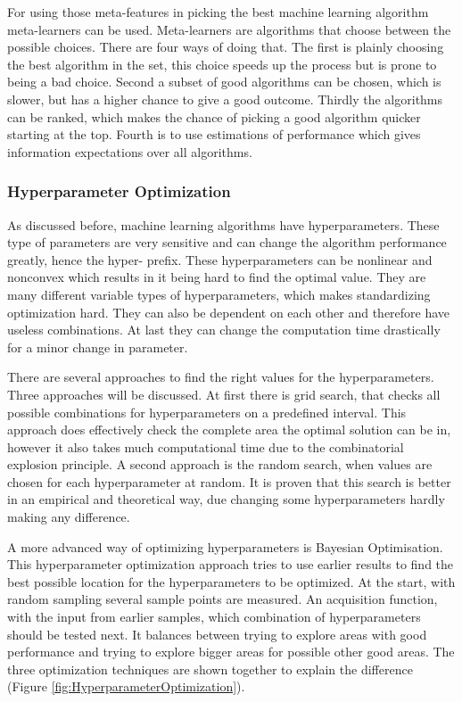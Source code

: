 \documentclass[10pt,a4paper]{article}
\begin{document}
	For using those meta-features in picking the best machine learning algorithm meta-learners can be used. Meta-learners are algorithms that choose between the possible choices. There are four ways of doing that. The first is plainly choosing the best algorithm in the set, this choice speeds up the process but is prone to being a bad choice. Second a subset of good algorithms can be chosen, which is slower, but has a higher chance to give a good outcome. Thirdly the algorithms can be ranked, which makes the chance of picking a good algorithm quicker starting at the top. Fourth is to use estimations of performance which gives information expectations over all algorithms.\cite{brazdil2009development}

	\subsubsection{Hyperparameter Optimization}
	\label{subsubsec:Hyperparameter optimization}

	As discussed before, machine learning algorithms have hyperparameters. These type of parameters are very sensitive and can change the algorithm performance greatly, hence the hyper- prefix. These hyperparameters can be nonlinear and nonconvex which results in it being hard to find the optimal value. They are many different variable types of hyperparameters, which makes standardizing optimization hard. They can also be dependent on each other and therefore have useless combinations. At last they can change the computation time drastically for a minor change in parameter.\cite{claesen2015hyperparameter}

	There are several approaches to find the right values for the hyperparameters. Three approaches will be discussed. At first there is grid search, that checks all possible combinations for hyperparameters on a predefined interval. This approach does effectively check the complete area the optimal solution can be in, however it also takes much computational time due to the combinatorial explosion principle.\cite{hsu2003practical} A second approach is the random search, when values are chosen for each hyperparameter at random. It is proven that this search is better in an empirical and theoretical way, due changing some hyperparameters hardly making any difference.\cite{bergstra2012random} 
	
	A more advanced way of optimizing hyperparameters is Bayesian Optimisation. This hyperparameter optimization approach tries to use earlier results to find the best possible location for the hyperparameters to be optimized. At the start, with random sampling several sample points are measured. An acquisition function, with the input from earlier samples, which combination of hyperparameters should be tested next. It balances between trying to explore areas with good performance and trying to explore bigger areas for possible other good areas.\cite{snoek2012practical} The three optimization techniques are shown together to explain the difference (Figure \ref{fig:HyperparameterOptimization}).
	
\end{document}
